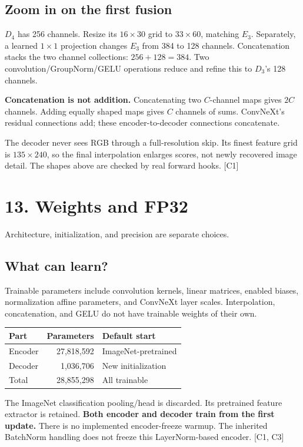 \documentclass[11pt,letterpaper]{article}
\newcommand{\note}[1]{\par\vspace{3pt}\begingroup\setlength{\fboxsep}{8pt}%
 \colorbox{pale}{\parbox{\dimexpr\linewidth-2\fboxsep\relax}{#1}}\endgroup\par\vspace{3pt}}
\newcommand{\guidepage}[2]{\clearpage\pdfbookmark[0]{#1}{guide-\thepage}\section*{#1}{\sffamily\color{muted}#2}\par\vspace{5pt}}
\begin{document}
\subsection*{Zoom in on the first fusion}
$D_4$ has 256 channels. Resize its $16\times30$ grid to $33\times60$, matching $E_3$. Separately, a learned $1\times1$ projection changes $E_3$ from 384 to 128 channels. Concatenation stacks the two channel collections: $256+128=384$. Two convolution/GroupNorm/GELU operations reduce and refine this to $D_3$'s 128 channels.

\note{\textbf{Concatenation is not addition.} Concatenating two $C$-channel maps gives $2C$ channels. Adding equally shaped maps gives $C$ channels of sums. ConvNeXt's residual connections add; these encoder-to-decoder connections concatenate.}
The decoder never sees RGB through a full-resolution skip. Its finest feature grid is $135\times240$, so the final interpolation enlarges scores, not newly recovered image detail. The shapes above are checked by real forward hooks. [C1]

\guidepage{13. Weights and FP32}{Architecture, initialization, and precision are separate choices.}
\subsection*{What can learn?}
Trainable parameters include convolution kernels, linear matrices, enabled biases, normalization affine parameters, and ConvNeXt layer scales. Interpolation, concatenation, and GELU do not have trainable weights of their own.

\begin{tabularx}{\linewidth}{@{}l r Y@{}}\toprule
\textbf{Part} & \textbf{Parameters} & \textbf{Default start}\\\midrule
Encoder & 27,818,592 & ImageNet-pretrained\\
Decoder & 1,036,706 & New initialization\\
Total & 28,855,298 & All trainable\\\bottomrule
\end{tabularx}

The ImageNet classification pooling/head is discarded. Its pretrained feature extractor is retained. \textbf{Both encoder and decoder train from the first update.} There is no implemented encoder-freeze warmup. The inherited BatchNorm handling does not freeze this LayerNorm-based encoder. [C1, C3]
\end{document}
